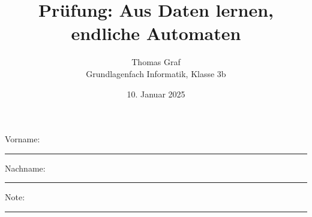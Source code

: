 \newtoggle{withbonus} \togglefalse{withbonus} %

\newcommand{\mycourse}{Grundlagenfach Informatik}
\newcommand{\myclass}{Klasse 3b}
\newcommand{\mydate}{10. Januar 2025}

\title{\textbf{Prüfung: Aus Daten lernen, endliche Automaten}}
\author{Thomas Graf\\
	\mycourse, \myclass}
\date{\mydate}
\maketitle
\thispagestyle{headandfoot}

\begin{center}
\end{center}
\vspace{10mm}

\begin{center}
	Vorname: \rule{45mm}{0.8pt}\qquad Nachname: \rule{45mm}{0.8pt}
\end{center}
\vspace{20mm}

\begin{center}
	\iftoggle{withbonus} {
		\combinedgradetable[h][questions]
	} {
		\gradetable[h][questions]
	}
\end{center}
\vspace{15mm}
\begin{center}
	Note:
	\vspace{10mm}

	\rule{8mm}{1.2pt}
\end{center}
\clearpage

